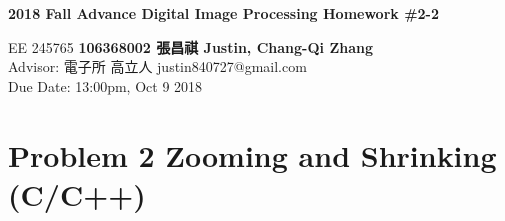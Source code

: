 \documentclass[a4paper, 11pt]{article}
\begin{document}
\noindent
\begin{center}
  \large\textbf{2018 Fall Advance Digital Image Processing Homework \#2-2} \\
\end{center}
\begin{CJK}{UTF8}{bsmi}
\normalsize EE 245765 \hfill \textbf{106368002 張昌祺 Justin, Chang-Qi Zhang} \\
Advisor: 電子所 高立人 \hfill justin840727@gmail.com \\
\null\hfill Due Date: 13:00pm, Oct 9 2018 \\
\end{CJK}

\section*{Problem 2 Zooming and Shrinking (C/C++)}
\end{document}
